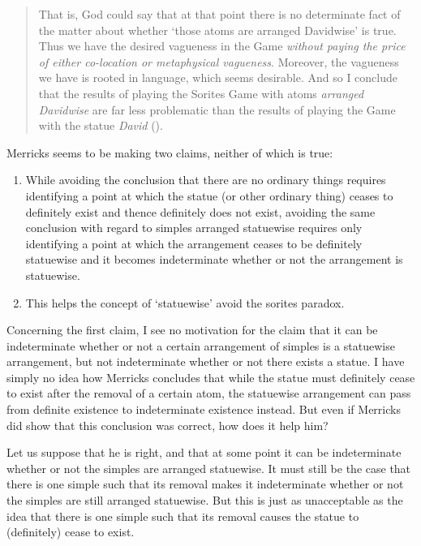 \documentclass[11pt]{article}
\newenvironment{squote}{%
	\begin{quote}\begin{singlespace}%
	}{%
	\end{singlespace}\end{quote}}
\begin{document}
\begin{spacing}{1.5}
\begin{squote}
That is, God could say that at that point there is no determinate fact
of the matter about whether `those atoms are arranged Davidwise' is
true.  Thus we have the desired vagueness in the Game {\em without
  paying the price of either co-location or metaphysical vagueness}.
Moreover, the vagueness we have is rooted in language, which seems
desirable.  And so I conclude that the results of playing the Sorites
Game with atoms {\em arranged Davidwise} are far less problematic than
the results of playing the Game with the statue {\em David}
(\citeyear[36--37]{merricks2001a}).
\end{squote}

Merricks seems to be making two claims, neither of which is true:

\begin{enumerate}
\item While avoiding the conclusion that there are no ordinary things
  requires identifying a point at which the statue (or other ordinary
  thing) ceases to definitely exist and thence definitely does not
  exist, avoiding the same conclusion with regard to simples arranged
  statuewise requires only identifying a point at which the
  arrangement ceases to be definitely statuewise and it becomes
  indeterminate whether or not the arrangement is statuewise.
\item This helps the concept of `statuewise' avoid the sorites
  paradox.
\end{enumerate}

Concerning the first claim, I see no motivation for the claim that it
can be indeterminate whether or not a certain arrangement of simples
is a statuewise arrangement, but not indeterminate whether or not
there exists a statue.  I have simply no idea how Merricks concludes
that while the statue must definitely cease to exist after the removal
of a certain atom, the statuewise arrangement can pass from definite
existence to indeterminate existence instead.  But even if Merricks
did show that this conclusion was correct, how does it help him?

Let us suppose that he is right, and that at some point it can be
indeterminate whether or not the simples are arranged statuewise.
It must still be the case that there is one simple such that its
removal makes it indeterminate whether or not the simples are still
arranged statuewise.  But this is just as unacceptable as the idea
that there is one simple such that its removal causes the statue to
(definitely) cease to exist.


\end{spacing}
\end{document}
